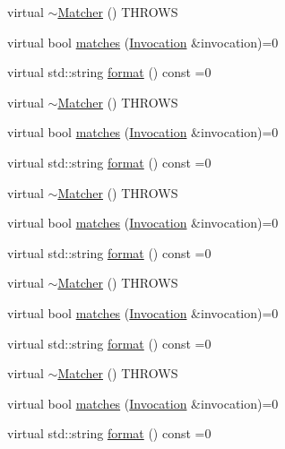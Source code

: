 \begin{DoxyCompactItemize}
\item 
virtual \mbox{\hyperlink{structfakeit_1_1Invocation_1_1Matcher_a8ef7a354a03360f00c193e3db12d2293}{$\sim$\+Matcher}} () T\+H\+R\+O\+WS
\item 
virtual bool \mbox{\hyperlink{structfakeit_1_1Invocation_1_1Matcher_a77b45c801fe29889c148516df1ffcb06}{matches}} (\mbox{\hyperlink{structfakeit_1_1Invocation}{Invocation}} \&invocation)=0
\item 
virtual std\+::string \mbox{\hyperlink{structfakeit_1_1Invocation_1_1Matcher_af570f2942a21d89cb3a09889bd9ac6f2}{format}} () const =0
\item 
virtual \mbox{\hyperlink{structfakeit_1_1Invocation_1_1Matcher_a8ef7a354a03360f00c193e3db12d2293}{$\sim$\+Matcher}} () T\+H\+R\+O\+WS
\item 
virtual bool \mbox{\hyperlink{structfakeit_1_1Invocation_1_1Matcher_a77b45c801fe29889c148516df1ffcb06}{matches}} (\mbox{\hyperlink{structfakeit_1_1Invocation}{Invocation}} \&invocation)=0
\item 
virtual std\+::string \mbox{\hyperlink{structfakeit_1_1Invocation_1_1Matcher_af570f2942a21d89cb3a09889bd9ac6f2}{format}} () const =0
\item 
virtual \mbox{\hyperlink{structfakeit_1_1Invocation_1_1Matcher_a8ef7a354a03360f00c193e3db12d2293}{$\sim$\+Matcher}} () T\+H\+R\+O\+WS
\item 
virtual bool \mbox{\hyperlink{structfakeit_1_1Invocation_1_1Matcher_a77b45c801fe29889c148516df1ffcb06}{matches}} (\mbox{\hyperlink{structfakeit_1_1Invocation}{Invocation}} \&invocation)=0
\item 
virtual std\+::string \mbox{\hyperlink{structfakeit_1_1Invocation_1_1Matcher_af570f2942a21d89cb3a09889bd9ac6f2}{format}} () const =0
\item 
virtual \mbox{\hyperlink{structfakeit_1_1Invocation_1_1Matcher_a8ef7a354a03360f00c193e3db12d2293}{$\sim$\+Matcher}} () T\+H\+R\+O\+WS
\item 
virtual bool \mbox{\hyperlink{structfakeit_1_1Invocation_1_1Matcher_a77b45c801fe29889c148516df1ffcb06}{matches}} (\mbox{\hyperlink{structfakeit_1_1Invocation}{Invocation}} \&invocation)=0
\item 
virtual std\+::string \mbox{\hyperlink{structfakeit_1_1Invocation_1_1Matcher_af570f2942a21d89cb3a09889bd9ac6f2}{format}} () const =0
\item 
virtual \mbox{\hyperlink{structfakeit_1_1Invocation_1_1Matcher_a8ef7a354a03360f00c193e3db12d2293}{$\sim$\+Matcher}} () T\+H\+R\+O\+WS
\item 
virtual bool \mbox{\hyperlink{structfakeit_1_1Invocation_1_1Matcher_a77b45c801fe29889c148516df1ffcb06}{matches}} (\mbox{\hyperlink{structfakeit_1_1Invocation}{Invocation}} \&invocation)=0
\item 
virtual std\+::string \mbox{\hyperlink{structfakeit_1_1Invocation_1_1Matcher_af570f2942a21d89cb3a09889bd9ac6f2}{format}} () const =0
\end{DoxyCompactItemize}


